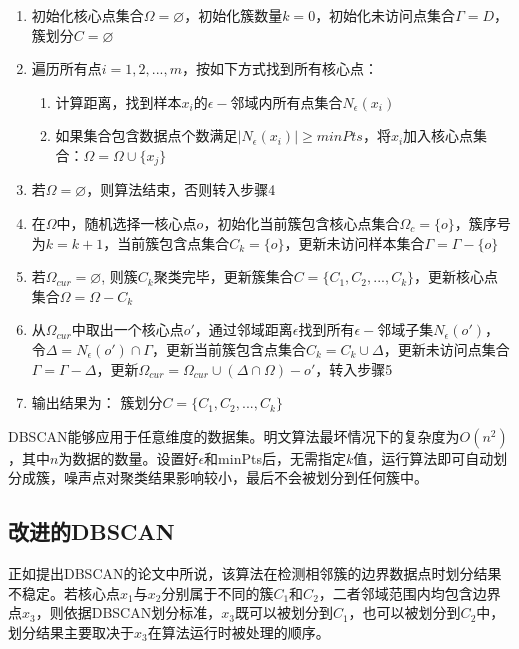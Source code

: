 \begin{enumerate}
	\item 初始化核心点集合$ \Omega = \varnothing  $，初始化簇数量$ k=0 $，初始化未访问点集合$ \Gamma = D $，簇划分$ C=\varnothing $
	\item 遍历所有点$ i=1,2,...,m $，按如下方式找到所有核心点：
	      \begin{enumerate}
		      \item 计算距离，找到样本$ x_i $的$ \epsilon- $邻域内所有点集合$ N_{\epsilon}(x_i) $
		      \item 如果集合包含数据点个数满足$ |N_{\epsilon}(x_i)| \geq minPts $，将$ x_i $加入核心点集合：$ \Omega = \Omega \cup \{x_j\} $
	      \end{enumerate}
	\item 若$ \Omega = \varnothing $，则算法结束，否则转入步骤4
	\item 在$ \Omega $中，随机选择一核心点$ o $，初始化当前簇包含核心点集合$ \Omega_{c}=\{o\} $，簇序号为$ k=k+1 $，当前簇包含点集合$ C_k=\{o\} $，更新未访问样本集合$ \Gamma = \Gamma - \{o\} $
	\item 若$ \Omega_{cur} = \varnothing $, 则簇$ C_k $聚类完毕，更新簇集合$ C=\{C_1,C_2,...,C_k\} $，更新核心点集合$ \Omega = \Omega - C_k $
	\item 从$ \Omega_{cur} $中取出一个核心点$ o' $，通过邻域距离$ \epsilon $找到所有$ \epsilon- $邻域子集$ N_{\epsilon}(o')  $，令$ \Delta = N_{\epsilon}(o') \cap \Gamma $，更新当前簇包含点集合$ C_k = C_k \cup \Delta $，更新未访问点集合$ \Gamma = \Gamma - \Delta $，更新$ \Omega_{cur} = \Omega_{cur}\cup(\Delta\cap\Omega)-o' $，转入步骤5
	\item 输出结果为： 簇划分$ C=\{C_1,C_2,...,C_k\} $
\end{enumerate}

DBSCAN能够应用于任意维度的数据集。明文算法最坏情况下的复杂度为$ O(n^2) $，其中$ n $为数据的数量。设置好$ \epsilon $和minPts后，无需指定$ k $值，运行算法即可自动划分成簇，噪声点对聚类结果影响较小，最后不会被划分到任何簇中。

\subsection{改进的DBSCAN}
正如提出DBSCAN的论文中所说，该算法在检测相邻簇的边界数据点时划分结果不稳定\cite{ester1996density}。若核心点$ x_1 $与$ x_2 $分别属于不同的簇$ C_1 $和$ C_2 $，二者邻域范围内均包含边界点$ x_3 $，则依据DBSCAN划分标准，$ x_3 $既可以被划分到$ C_1 $，也可以被划分到$ C_2 $中，划分结果主要取决于$ x_3 $在算法运行时被处理的顺序。

